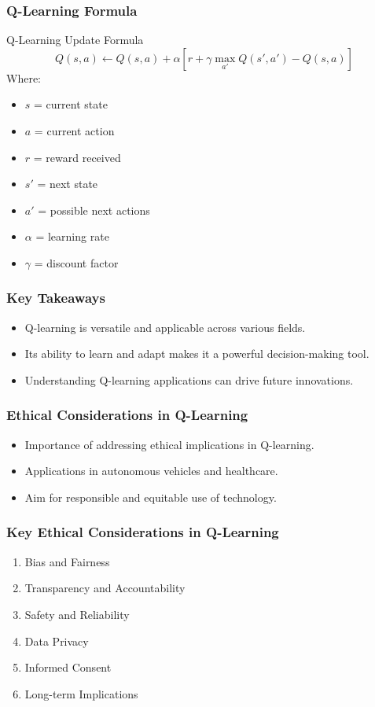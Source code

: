 \documentclass{beamer}
\begin{document}
\begin{frame}[fragile]
    \frametitle{Q-Learning Formula}
    \begin{block}{Q-Learning Update Formula}
    \begin{equation}
        Q(s, a) \leftarrow Q(s, a) + \alpha [r + \gamma \max_{a'} Q(s', a') - Q(s, a)]
    \end{equation}
    Where:
    \begin{itemize}
        \item $s$ = current state
        \item $a$ = current action
        \item $r$ = reward received
        \item $s'$ = next state
        \item $a'$ = possible next actions
        \item $\alpha$ = learning rate
        \item $\gamma$ = discount factor
    \end{itemize}
    \end{block}
\end{frame}

\begin{frame}[fragile]
    \frametitle{Key Takeaways}
    \begin{itemize}
        \item Q-learning is versatile and applicable across various fields.
        \item Its ability to learn and adapt makes it a powerful decision-making tool.
        \item Understanding Q-learning applications can drive future innovations.
    \end{itemize}
\end{frame}

\begin{frame}
    \frametitle{Ethical Considerations in Q-Learning}
    \begin{itemize}
        \item Importance of addressing ethical implications in Q-learning.
        \item Applications in autonomous vehicles and healthcare.
        \item Aim for responsible and equitable use of technology.
    \end{itemize}
\end{frame}

\begin{frame}
    \frametitle{Key Ethical Considerations in Q-Learning}
    \begin{enumerate}
        \item Bias and Fairness
        \item Transparency and Accountability
        \item Safety and Reliability
        \item Data Privacy
        \item Informed Consent
        \item Long-term Implications
    \end{enumerate}
\end{frame}
\end{document}
